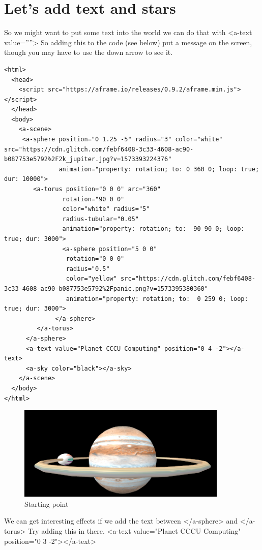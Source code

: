 \section{Let's add text and stars}
So we might want to put some text into the world we can do that with <a-text value=””> So adding this to the code (see below) put a message on the screen, though you may have to use the down arrow to see it.

\begin{lstlisting}
<html>
  <head>
    <script src="https://aframe.io/releases/0.9.2/aframe.min.js"></script>
  </head>
  <body>
    <a-scene>
     <a-sphere position="0 1.25 -5" radius="3" color="white" src="https://cdn.glitch.com/febf6408-3c33-4608-ac90-b087753e5792%2F2k_jupiter.jpg?v=1573393224376"
               animation="property: rotation; to: 0 360 0; loop: true; dur: 10000">
        <a-torus position="0 0 0" arc="360"
                rotation="90 0 0"
                color="white" radius="5"
                radius-tubular="0.05"
                animation="property: rotation; to:  90 90 0; loop: true; dur: 3000">
                <a-sphere position="5 0 0"
                 rotation="0 0 0"
                 radius="0.5"
                 color="yellow" src="https://cdn.glitch.com/febf6408-3c33-4608-ac90-b087753e5792%2Fpanic.png?v=1573395380360"
                 animation="property: rotation; to:  0 259 0; loop: true; dur: 3000">
              </a-sphere>
         </a-torus>
      </a-sphere>   
      <a-text value="Planet CCCU Computing" position="0 4 -2"></a-text>
      <a-sky color="black"></a-sky>
    </a-scene>
  </body>
</html>
\end{lstlisting}

\begin{figure}
    \centering
    \includegraphics[width=10cm]{chapters/chapter2/figures/Picture1.png}
    \caption{Starting point}
    \label{fig:Planet again}
\end{figure}

We can get interesting effects if we add the text between  </a-sphere> and </a-torus> Try adding this in there. <a-text value="Planet CCCU Computing" position="0 3 -2"></a-text>

